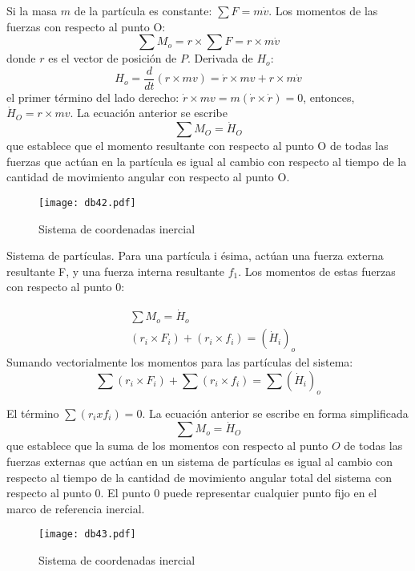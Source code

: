 Si la masa $m$ de la partícula es constante: $\sum F= m\dot{v}$. Los momentos de las fuerzas con respecto al punto O:
\begin{equation}
    \sum M_o = r \times \sum F = r \times m\dot{v}
\end{equation}
donde $r$ es el vector de posición de $P$. Derivada de $H_o$:
\begin{equation}
    H_o = \frac{d}{dt}\left(r \times mv\right) =\dot{r} \times mv + r \times m\dot{v}
\end{equation}
el primer término del lado derecho: $\dot{r}\times mv = m(\dot{r} \times  \dot{r}) = 0$, entonces, $\dot{H}_O= r\times mv$. La ecuación anterior se escribe
\begin{equation}
    \sum M_O = \dot{H}_O
\end{equation}
que establece que el momento resultante con respecto al punto O de todas las fuerzas que actúan en la partícula es igual al cambio con respecto al tiempo de la cantidad de movimiento angular con respecto al punto O.
\begin{figure}[h!]
\centering
  \texttt{[image: db42.pdf]}
  \caption{Sistema de coordenadas inercial}
  \label{db42}
\end{figure}


Sistema de partículas. Para una partícula i ésima, actúan una fuerza externa resultante F, y una fuerza interna resultante $f_1$. Los momentos de estas fuerzas con respecto al punto 0:

\begin{align*}
    &\sum M_o = \dot{H}_o\\
    &\left(r_i \times F_i\right) +\left(r_i \times f_i\right) =\left(\dot{H}_i\right)_o
\end{align*}
Sumando vectorialmente los momentos para las partículas del sistema:
\begin{equation*}
    \sum (r_i \times  F_i) + \sum (r_i \times  f_i) = \sum (\dot{H}_i)_o
\end{equation*}

El término $\sum (r_i x f_i)=0$. La ecuación anterior se escribe en forma simplificada
\begin{equation}
    \sum M_o = \dot{H}_O
\end{equation}
que establece que la suma de los momentos con respecto al punto $O$ de todas las fuerzas externas que actúan en un sistema de partículas es igual al cambio con respecto al tiempo de la cantidad de movimiento angular total del sistema con respecto al punto 0. El punto 0 puede representar cualquier punto fijo en el marco de referencia inercial.
\begin{figure}[h!]
\centering
  \texttt{[image: db43.pdf]}
  \caption{Sistema de coordenadas inercial}
  \label{db43}
\end{figure}

